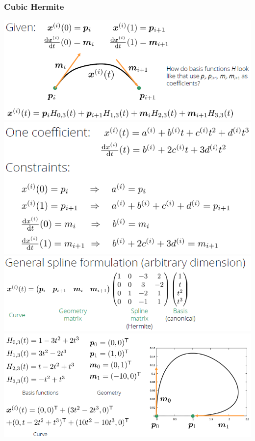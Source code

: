 \documentclass{article}
\begin{document}
\subsubsection{Cubic Hermite}
\includegraphics[scale=0.5]{image84.png}
\includegraphics[scale=0.5]{image85.png}\\
\includegraphics[scale=0.5]{image87.png}
\includegraphics[scale=0.5]{image86.png}\\\\
\end{document}

